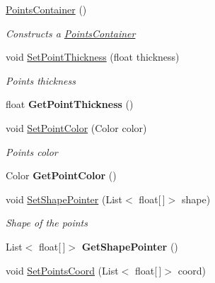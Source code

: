 \begin{DoxyCompactItemize}
\item 
\mbox{\hyperlink{class_space_v_i_l_1_1_points_container_ac769a83ca0591540c776169c376446a3}{Points\+Container}} ()
\begin{DoxyCompactList}\small\item\em Constructs a \mbox{\hyperlink{class_space_v_i_l_1_1_points_container}{Points\+Container}} \end{DoxyCompactList}\item 
void \mbox{\hyperlink{class_space_v_i_l_1_1_points_container_a0926aa9cf438fe742d4b7ad6c5cdcd7d}{Set\+Point\+Thickness}} (float thickness)
\begin{DoxyCompactList}\small\item\em Points thickness \end{DoxyCompactList}\item 
\mbox{\label{class_space_v_i_l_1_1_points_container_a289a6eb2df75c9a2c02dc69b3cbcfaf0}} 
float {\bfseries Get\+Point\+Thickness} ()
\item 
void \mbox{\hyperlink{class_space_v_i_l_1_1_points_container_a35182a540471d4cd742ad2b484cd8769}{Set\+Point\+Color}} (Color color)
\begin{DoxyCompactList}\small\item\em Points color \end{DoxyCompactList}\item 
\mbox{\label{class_space_v_i_l_1_1_points_container_aa0a2d535d8044c729aff9622b2457be4}} 
Color {\bfseries Get\+Point\+Color} ()
\item 
void \mbox{\hyperlink{class_space_v_i_l_1_1_points_container_a0694fefae0c13a4006608adc71c9f706}{Set\+Shape\+Pointer}} (List$<$ float\mbox{[}$\,$\mbox{]}$>$ shape)
\begin{DoxyCompactList}\small\item\em Shape of the points \end{DoxyCompactList}\item 
\mbox{\label{class_space_v_i_l_1_1_points_container_a34976d6b46131e939358bcbffbce7d96}} 
List$<$ float\mbox{[}$\,$\mbox{]}$>$ {\bfseries Get\+Shape\+Pointer} ()
\item 
void \mbox{\hyperlink{class_space_v_i_l_1_1_points_container_abcf47862e61ce7aea7992ced4258da2c}{Set\+Points\+Coord}} (List$<$ float\mbox{[}$\,$\mbox{]}$>$ coord)

\end{DoxyCompactItemize}
